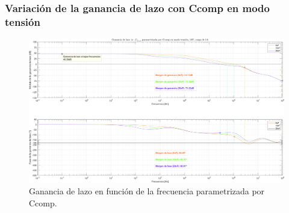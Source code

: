 
\subsubsection{Variación de la ganancia de lazo con Ccomp en modo tensión}



\begin{figure}[H] %
\begin{center}
\includegraphics[width=1.1 \textwidth, angle=90]{./img/plots/loop/power_supply_CCOMP_LOOP_Modo1.png}
\caption{\label{fig:fig_power_supply_CCOMP_LOOP_Modo1}\footnotesize{Ganancia de lazo en función de la frecuencia parametrizada por Ccomp.}}
\end{center}
\end{figure}

\clearpage
